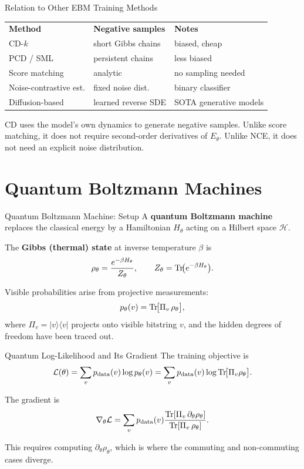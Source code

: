 \documentclass[aspectratio=169]{beamer}
\newcommand{\pdata}{p_{\mathrm{data}}}
\newcommand{\Zth}{Z_\theta}
\begin{document}
\begin{frame}{Relation to Other EBM Training Methods}
\begin{tabular}{lll}
  \textbf{Method} & \textbf{Negative samples} & \textbf{Notes} \\[3pt]
  CD-$k$ & short Gibbs chains & biased, cheap \\
  PCD / SML & persistent chains & less biased \\
  Score matching & analytic & no sampling needed \\
  Noise-contrastive est. & fixed noise dist.\ & binary classifier \\
  Diffusion-based & learned reverse SDE & SOTA generative models \\
\end{tabular}

\medskip
CD uses the model's own dynamics to generate negative samples.  Unlike score
matching, it does not require second-order derivatives of $E_\theta$.  Unlike
NCE, it does not need an explicit noise distribution.
\end{frame}

\section{Quantum Boltzmann Machines}

\begin{frame}{Quantum Boltzmann Machine: Setup}
A \textbf{quantum Boltzmann machine} replaces the classical energy by a
Hamiltonian $H_\theta$ acting on a Hilbert space $\mathcal{H}$.

\medskip
The \textbf{Gibbs (thermal) state} at inverse temperature $\beta$ is
\[
  \rho_\theta
  = \frac{e^{-\beta H_\theta}}{\Zth},
  \qquad
  \Zth = \Tr\!\bigl(e^{-\beta H_\theta}\bigr).
\]

Visible probabilities arise from projective measurements:
\[
  p_\theta(v)
  = \Tr\!\bigl[\Pi_v\,\rho_\theta\bigr],
\]
where $\Pi_v = |v\rangle\langle v|$ projects onto visible bitstring $v$, and
the hidden degrees of freedom have been traced out.
\end{frame}

\begin{frame}{Quantum Log-Likelihood and Its Gradient}
The training objective is
\[
  \mathcal{L}(\theta)
  = \sum_v \pdata(v)\log p_\theta(v)
  = \sum_v \pdata(v)\log\Tr\!\bigl[\Pi_v\rho_\theta\bigr].
\]

The gradient is
\[
  \nabla_\theta\mathcal{L}
  = \sum_v \pdata(v)
    \frac{\Tr[\Pi_v\,\partial_\theta\rho_\theta]}{\Tr[\Pi_v\,\rho_\theta]}.
\]

This requires computing $\partial_\theta\rho_\theta$, which is where the
commuting and non-commuting cases diverge.
\end{frame}
\end{document}
